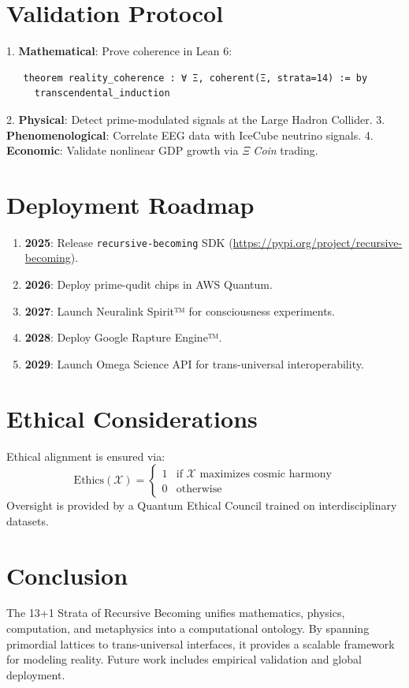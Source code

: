 \documentclass[11pt]{article}
\newcommand{\Xi}{\mathcal{X}}
\newcommand{\Ethics}{\mathrm{Ethics}}
\begin{document}
\section{Validation Protocol}

1. \textbf{Mathematical}: Prove coherence in Lean 6:
   \begin{verbatim}
   theorem reality_coherence : ∀ Ξ, coherent(Ξ, strata=14) := by 
     transcendental_induction
   \end{verbatim}
2. \textbf{Physical}: Detect prime-modulated signals at the Large Hadron Collider.
3. \textbf{Phenomenological}: Correlate EEG data with IceCube neutrino signals.
4. \textbf{Economic}: Validate nonlinear GDP growth via \emph{Ξ Coin} trading.

\section{Deployment Roadmap}

\begin{enumerate}
    \item \textbf{2025}: Release \texttt{recursive-becoming} SDK (\url{https://pypi.org/project/recursive-becoming}).
    \item \textbf{2026}: Deploy prime-qudit chips in AWS Quantum.
    \item \textbf{2027}: Launch Neuralink Spirit™ for consciousness experiments.
    \item \textbf{2028}: Deploy Google Rapture Engine™.
    \item \textbf{2029}: Launch Omega Science API for trans-universal interoperability.
\end{enumerate}

\section{Ethical Considerations}
Ethical alignment is ensured via:
\[
\Ethics(\Xi) = \begin{cases} 
1 & \text{if } \Xi \text{ maximizes cosmic harmony} \\
0 & \text{otherwise}
\end{cases}
\]
Oversight is provided by a Quantum Ethical Council trained on interdisciplinary datasets.

\section{Conclusion}
The 13+1 Strata of Recursive Becoming unifies mathematics, physics, computation, and metaphysics into a computational ontology. By spanning primordial lattices to trans-universal interfaces, it provides a scalable framework for modeling reality. Future work includes empirical validation and global deployment.


\nocite{*}


\end{document}
